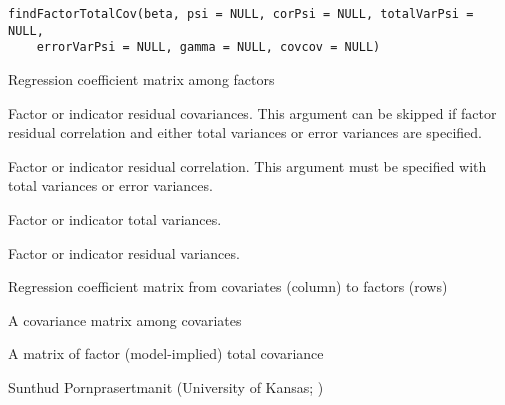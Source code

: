 \documentclass[a4paper]{book}
\begin{document}
%
\begin{Usage}
\begin{verbatim}
findFactorTotalCov(beta, psi = NULL, corPsi = NULL, totalVarPsi = NULL, 
    errorVarPsi = NULL, gamma = NULL, covcov = NULL)
\end{verbatim}
\end{Usage}
%
\begin{Arguments}
\begin{ldescription}
\item[\code{beta}] 
Regression coefficient matrix among factors

\item[\code{psi}] 
Factor or indicator residual covariances. This argument can be skipped if factor residual correlation and either total variances or error variances are specified.

\item[\code{corPsi}] 
Factor or indicator residual correlation. This argument must be specified with total variances or error variances.

\item[\code{totalVarPsi}] 
Factor or indicator total variances.

\item[\code{errorVarPsi}] 
Factor or indicator residual variances. 

\item[\code{gamma}] 
Regression coefficient matrix from covariates (column) to factors (rows)

\item[\code{covcov}] 
A covariance matrix among covariates

\end{ldescription}
\end{Arguments}
%
\begin{Value}
A matrix of factor (model-implied) total covariance
\end{Value}
%
\begin{Author}\relax
Sunthud Pornprasertmanit (University of Kansas; )
\end{Author}
%
\end{document}
